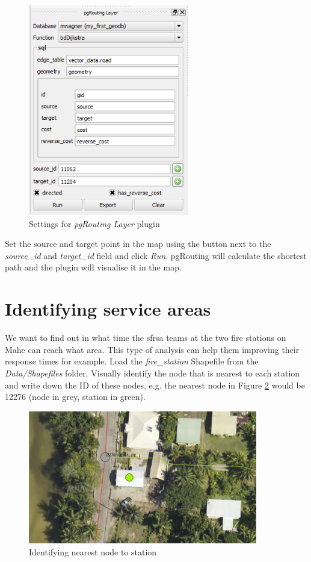 \documentclass[a4paper,12pt,titlepage]{article}
\begin{document}
\begin{figure}[htb]
	\centering
	\includegraphics[width=7cm]{Images/pgrouting_plugin.png}
	\caption{Settings for \textit{pgRouting Layer} plugin}\label{fig:pgrouting_plugin}
\end{figure}

Set the source and target point in the map using the button next to the \textit{source\_id} and \textit{target\_id} field and click \textit{Run}. pgRouting will calculate the shortest path and the plugin will visualise it in the map.

\section{Identifying service areas}

We want to find out in what time the \gls{sfrsa} teams at the two fire stations on Mahe can reach what area. This type of analysis can help them improving their response times for example. Load the \textit{fire\_station} Shapefile from the \textit{Data/Shapefiles} folder. Visually identify the node that is nearest to each station and write down the ID of these nodes, e.g. the nearest node in Figure \ref{fig:nearest_node} would be 12276 (node in grey, station in green). 

\begin{figure}[htb]
	\centering
	\includegraphics[width=10cm]{Images/nearest_node.png}
	\caption{Identifying nearest node to station}\label{fig:nearest_node}
\end{figure}
\end{document}
